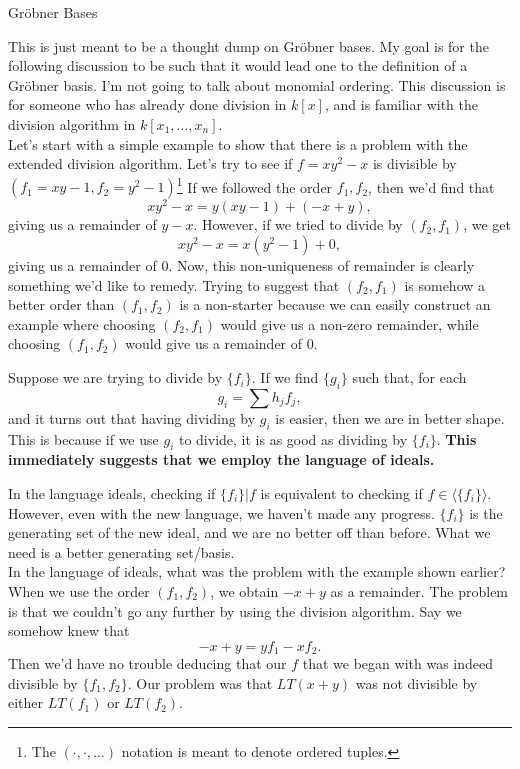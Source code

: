 \documentclass[10pt]{article}
\newcommand{\gb}{Gr\"{o}bner }
\newcommand*{\ideal}[1]{\langle#1\rangle}
\begin{document}
\begin{center}\sc\Large
\gb Bases
\end{center}

This is just meant to be a thought dump on \gb bases. My goal is for the following discussion to be such that it would lead one to the definition of a \gb basis. I'm not going to talk about monomial ordering. This discussion is for someone who has already done division in $k[x]$, and is familiar with the division algorithm in $k[x_1, \ldots, x_n]$. \\

Let's start with a simple example to show that there is a problem with the extended division algorithm. Let's try to see if $f = xy^2 - x$ is divisible by $(f_1 = xy - 1, f_2 = y^2 - 1)$\footnote{The $(\cdot, \cdot, \ldots)$ notation is meant to denote ordered tuples.} If we followed the order $f_1, f_2$, then we'd find that
\[
xy^2 - x = y(xy-1) + (-x + y),
\]
giving us a remainder of $y-x$. However, if we tried to divide by $(f_2, f_1)$, we get
\[
xy^2 - x = x(y^2-1) + 0,
\]
giving us a remainder of 0. Now, this non-uniqueness of remainder is clearly something we'd like to remedy. Trying to suggest that $(f_2, f_1)$ is somehow a better order than $(f_1, f_2)$ is a non-starter because we can easily construct an example where choosing $(f_2, f_1)$ would give us a non-zero remainder, while choosing $(f_1, f_2)$ would give us a remainder of 0. \\

\begin{ideabox}
Suppose we are trying to divide by $\{f_i\}$. If we find $\{g_i\}$  such that, for each 
\[
g_i = \sum h_jf_j,
\]
and it turns out that having dividing by $g_i$ is easier, then we are in better shape. This is because if we use $g_i$ to divide, it is as good as dividing by $\{f_i\}$. \textbf{This immediately suggests that we employ the language of ideals.}
\end{ideabox}

In the language ideals, checking if $\{f_i\} | f$ is equivalent to checking if $f \in \ideal{\{f_i\}}$. However, even with the new language, we haven't made any progress. $\{f_i\}$ is the generating set of the new ideal, and we are no better off than before. What we need is a better generating set/basis. \\

In the language of ideals, what was the problem with the example shown earlier? When we use the order $(f_1, f_2)$, we obtain $-x + y$ as a remainder. The problem is that we couldn't go any further by using the division algorithm. Say we somehow knew that
\[
-x + y = yf_1 - xf_2.
\]
Then we'd have no trouble deducing that our $f$ that we began with was indeed divisible by $\{f_1, f_2\}$. Our problem was that $LT(x+y)$ was not divisible by either $LT(f_1)$ or $LT(f_2)$. 
\end{document}
